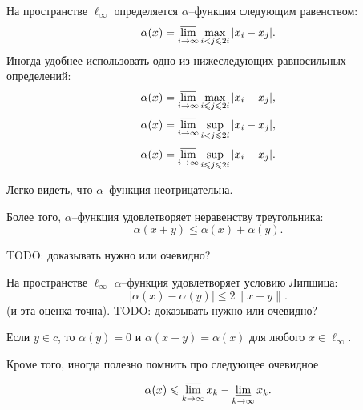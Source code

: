 На пространстве $\ell_\infty$ определяется $\alpha$--функция следующим равенством:
\begin{equation}
	\alpha(x) = \varlimsup_{i\to\infty} \max_{i<j\leqslant 2i} |x_i - x_j|
	.
\end{equation}
Иногда удобнее использовать одно из нижеследующих равносильных определений:
\begin{equation}
	\alpha(x) = \varlimsup_{i\to\infty} \max_{i \leqslant j\leqslant 2i} |x_i - x_j|
	,
\end{equation}
\begin{equation}
	\alpha(x) = \varlimsup_{i\to\infty} \sup_{i<j\leqslant 2i} |x_i - x_j|
	,
\end{equation}
\begin{equation}
	\alpha(x) = \varlimsup_{i\to\infty} \sup_{i \leqslant j\leqslant 2i} |x_i - x_j|
	.
\end{equation}

Легко видеть, что $\alpha$--функция неотрицательна.
\begin{property}
	\label{thm:alpha_x_triangle_ineq}
	Более того, $\alpha$--функция удовлетворяет неравенству треугольника:
	\begin{equation}
		\alpha(x+y) \leq \alpha(x) + \alpha(y)
		.
	\end{equation}
\end{property}
TODO: доказывать нужно или очевидно?

\begin{property}
	На пространстве $\ell_\infty$ $\alpha$--функция удовлетворяет условию Липшица:
	\begin{equation}\label{alpha_Lipshitz}
		|\alpha(x) - \alpha(y)| \leq 2 \|x-y\|
		.
	\end{equation}
	(и эта оценка точна).
	TODO: доказывать нужно или очевидно?
\end{property}

\begin{property}
	Если $y\in c$, то $\alpha(y) = 0$ и $\alpha(x+y) = \alpha(x)$ для любого $x \in \ell_\infty$.
\end{property}

Кроме того, иногда полезно помнить про следующее очевидное
\begin{property}
	\label{thm:alpha_x_leq_limsup_minus_liminf}
	\begin{equation}
		\alpha(x) \leq \varlimsup_{k\to\infty} x_k - \varliminf_{k\to\infty} x_k
		.
	\end{equation}
\end{property}
